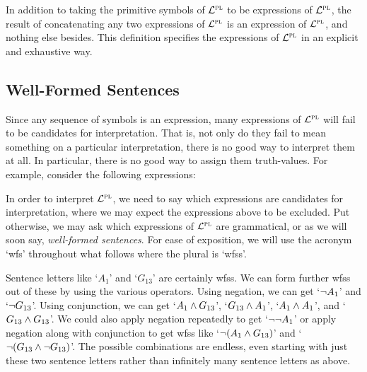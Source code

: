 
In addition to taking the primitive symbols of $\mathcal{L}^{\textsc{pl}}$ to be expressions of $\mathcal{L}^{\textsc{pl}}$, the result of concatenating any two expressions of $\mathcal{L}^{\textsc{pl}}$ is an expression of $\mathcal{L}^{\textsc{pl}}$, and nothing else besides.
This definition specifies the expressions of $\mathcal{L}^{\textsc{pl}}$ in an explicit and exhaustive way.





\subsection{Well-Formed Sentences}
  \label{sub.wfs}

Since any sequence of symbols is an expression, many expressions of $\mathcal{L}^{\textsc{pl}}$ will fail to be candidates for interpretation.
That is, not only do they fail to mean something on a particular interpretation, there is no good way to interpret them at all.
In particular, there is no good way to assign them truth-values.
For example, consider the following expressions:

\begin{earg}
  \eitem{\enot\enot\enot\enot}
  \eitem{))\eiff}
\end{earg}

In order to interpret $\mathcal{L}^{\textsc{pl}}$, we need to say which expressions are candidates for interpretation, where we may expect the expressions above to be excluded.
Put otherwise, we may ask which expressions of $\mathcal{L}^{\textsc{pl}}$ are grammatical, or as we will soon say, \textit{well-formed sentences}.
For ease of exposition, we will use the acronym `wfs' throughout what follows where the plural is `wfss'.

Sentence letters like `$A_1$' and `$G_{13}$' are certainly wfss.
We can form further wfss out of these by using the various operators.
Using negation, we can get `$\neg A_1$' and `$\neg G_{13}$'.
Using conjunction, we can get `$A_1 \wedge G_{13}$', `$G_{13} \wedge A_1$', `$A_1 \wedge A_1$', and `$G_{13} \wedge G_{13}$'.
We could also apply negation repeatedly to get `$\neg \neg A_1$' or apply negation along with conjunction to get wfss like `$\neg(A_1 \wedge G_{13})$' and `$\neg(G_{13} \wedge \neg G_{13})$'.
The possible combinations are endless, even starting with just these two sentence letters rather than infinitely many sentence letters as above.

